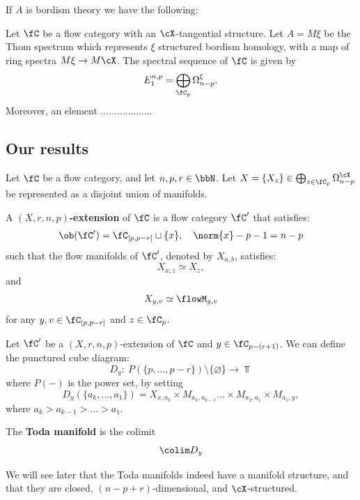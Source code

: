  If $A$ is bordism theory we have the following:
 \begin{thm}
    Let $\fC$ be a flow category with an $\cX$-tangential structure. Let $A = M\xi$ be the Thom spectrum which represents $\xi$ structured bordism homology, with a map of ring spectra $M\xi \to M\cX$.
    The spectral sequence of $\fC$ is given by
    \begin{equation*}
        E_1^{n,p} = \bigoplus_{\fC_p} \Omega^{\xi}_{n-p}.
    \end{equation*}
    Moreover, an element ...................
 \end{thm}

\subsection*{Our results}
\begin{defn}\label{def:Xrnp-extension}
Let $\fC$ be a flow category, and let $n, p, r \in \bbN$. Let $X = \{X_z\} \in \bigoplus_{z \in \fC_p} \Omega^{\operatorname{\cX}}_{n - p}$ be represented as a disjoint union of manifolds.

A \textbf{$(X,r,n,p)$-extension} of $\fC$ is a flow category $\fC'$ that satisfies:
\begin{equation*}
    \ob(\fC') = \fC_{[p,p-r]} \sqcup \{x\},\quad \norm{x}-p-1 = n-p
\end{equation*}
such that the flow manifolds of $\fC'$, denoted by $X_{a,b}$, satisfies:
\begin{equation*}
    X_{x, z} \simeq X_z,
\end{equation*}
and
\begin{equation*}
    X_{y,v} \simeq \flowM_{y,v}
\end{equation*}
for any $y,v \in \fC_{[p,p-r]}$ and $z \in \fC_p$.
\end{defn}
\begin{defn}\label{def:smallToda}
    Let $\fC'$ be a $(X,r,n,p)$-extension of $\fC$ and $y \in \fC_{p-(r+1)}$. We can define the punctured cube diagram:
    \begin{equation*}
        D_y: \ P(\{p,\dots,p-r\}) \setminus \{\varnothing\} \to \Top
    \end{equation*}
    where $P(-)$ is the power set, by setting
    \begin{equation*}
        D_y(\{a_k, \dots, a_1\}) = X_{x,a_k} \times M_{a_k,a_{k-1}} \dots \times M_{a_2,a_1} \times M_{a_1,y},
    \end{equation*}
    where $a_k > a_{k-1} > \dots > a_1$.
    
    The \textbf{Toda manifold} is the colimit
    \begin{equation*}
        \colim D_y
    \end{equation*}
\end{defn}
We will see later that the Toda manifolds indeed have a manifold structure, and that they are closed, $(n-p+r)$-dimensional, and $\cX$-structured.



